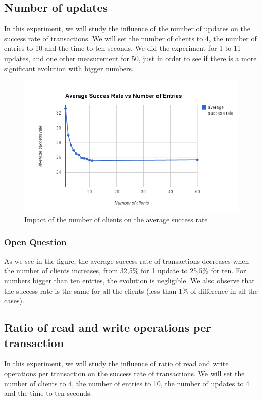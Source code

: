 \documentclass[a4paper, 11pt]{article}
\begin{document}
\subsection{Number of updates}
In this experiment, we will study the influence of the number of updates on the success rate of transactions. We will set the number of clients to 4, the number of entries to 10 and the time to ten seconds. We did the experiment for 1 to 11 updates, and one other measurement for 50, just in order to see if there is a more significant evolution with bigger numbers.

\begin{figure}[H]
\begin{center}
\includegraphics[scale=0.5]{exp3.png}
\caption{Impact of the number of clients on the average success rate}
\end{center}
\end{figure}

\subsubsection{Open Question}
As we see in the figure, the average success rate of transactions decreases when the number of clients increases, from 32,5\% for 1 update to 25,5\% for ten. For numbers bigger than ten entries, the evolution is negligible. We also observe that the success rate is the same for all the clients (less than 1\% of difference in all the cases).


\subsection{Ratio of read and write operations per transaction}
In this experiment, we will study the influence of ratio of read and write operations per transaction on the success rate of transactions. We will set the number of clients to 4, the number of entries to 10, the number of updates to 4 and the time to ten seconds.
\end{document}
